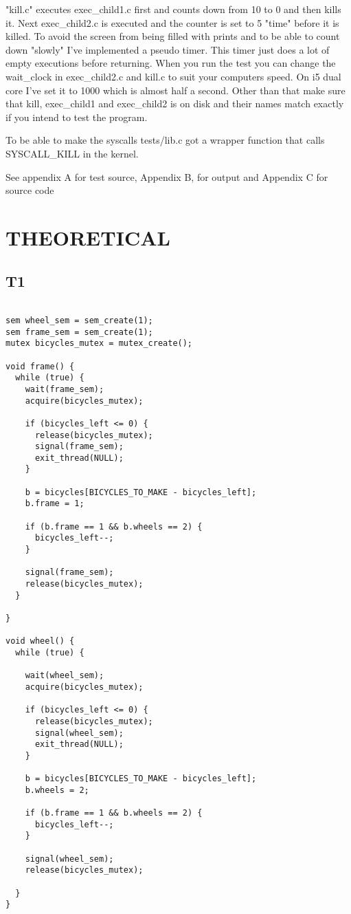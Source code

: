 \documentclass[12pt]{article}
\begin{document}
"kill.c" executes exec\_child1.c first and counts down from 10 to 0 and then kills it. Next exec\_child2.c is executed and the counter is set to 5 "time" before it is killed. To avoid the screen from being filled with prints and to be able to count down "slowly" I've implemented a pseudo timer. This timer just does a lot of empty executions before returning. When you run the test you can change the wait\_clock in exec\_child2.c and kill.c to suit your computers speed. On i5 dual core I've set it to 1000 which is almost half a second. Other than that make sure that kill, exec\_child1 and exec\_child2 is on disk and their names match exactly if you intend to test the program. 

To be able to make the syscalls tests/lib.c got a wrapper function that calls SYSCALL\_KILL in the kernel.

See appendix A for test source, Appendix B, for output and Appendix C for source code


\newpage
\newpage

\section{THEORETICAL}

\subsection{T1}

\begin{lstlisting}[label=bicycle-code,caption=Bicycle Factory]

sem wheel_sem = sem_create(1);
sem frame_sem = sem_create(1);
mutex bicycles_mutex = mutex_create();

void frame() {
  while (true) {
    wait(frame_sem);
    acquire(bicycles_mutex);

    if (bicycles_left <= 0) {
      release(bicycles_mutex);
      signal(frame_sem);
      exit_thread(NULL);
    }

    b = bicycles[BICYCLES_TO_MAKE - bicycles_left];
    b.frame = 1;

    if (b.frame == 1 && b.wheels == 2) {
      bicycles_left--;
    }

    signal(frame_sem);
    release(bicycles_mutex);
  }

}

void wheel() {
  while (true) {

    wait(wheel_sem);
    acquire(bicycles_mutex);

    if (bicycles_left <= 0) {
      release(bicycles_mutex);
      signal(wheel_sem);
      exit_thread(NULL);
    }

    b = bicycles[BICYCLES_TO_MAKE - bicycles_left];
    b.wheels = 2;

    if (b.frame == 1 && b.wheels == 2) {
      bicycles_left--;
    }

    signal(wheel_sem);
    release(bicycles_mutex);
    
  }
}

\end{lstlisting}
\end{document}

